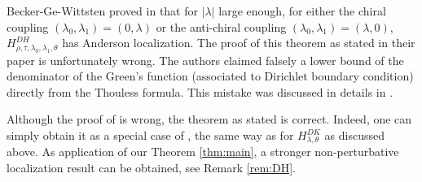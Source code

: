 \documentclass[11pt]{amsart}
\begin{document}
Becker-Ge-Wittsten proved in \cite[Theorem 1]{BGW} that for $|\lambda|$ large enough, for either the chiral coupling $(\lambda_0,\lambda_1)=(0,\lambda)$ or the anti-chiral coupling $(\lambda_0,\lambda_1)=(\lambda,0)$, $H^{DH}_{\rho,\tau,\lambda_0,\lambda_1,\theta}$ has Anderson localization. 
The proof of this theorem as stated in their paper is unfortunately wrong. The authors claimed falsely a lower bound of the denominator of the Green's function (associated to Dirichlet boundary condition) directly from the Thouless formula. 
This mistake was discussed in details in \cite[Remark 3.4]{HS3}.

Although the proof of \cite[Theorem 1]{BGW} is wrong, the theorem as stated is correct. Indeed, one can simply obtain it as a special case of \cite{Kl}, the same way as for $H^{DK}_{\lambda,\theta}$ as discussed above.
As application of our Theorem \ref{thm:main}, a stronger non-perturbative localization result can be obtained, see Remark \ref{rem:DH}.
\end{document}
